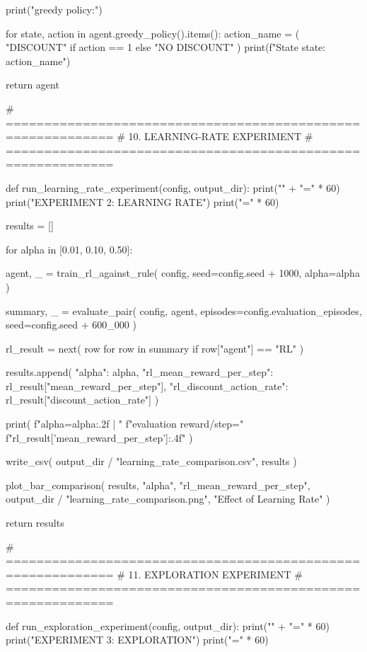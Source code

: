     print("\nLearned greedy policy:")

    for state, action in agent.greedy_policy().items():
        action_name = (
            "DISCOUNT" if action == 1
            else "NO DISCOUNT"
        )
        print(f"State {state}: {action_name}")

    return agent


# ============================================================
# 10. LEARNING-RATE EXPERIMENT
# ============================================================

def run_learning_rate_experiment(config, output_dir):
    print("\n" + "=" * 60)
    print("EXPERIMENT 2: LEARNING RATE")
    print("=" * 60)

    results = []

    for alpha in [0.01, 0.10, 0.50]:

        agent, _ = train_rl_against_rule(
            config,
            seed=config.seed + 1000,
            alpha=alpha
        )

        summary, _ = evaluate_pair(
            config,
            agent,
            episodes=config.evaluation_episodes,
            seed=config.seed + 600_000
        )

        rl_result = next(
            row for row in summary
            if row["agent"] == "RL"
        )

        results.append({
            "alpha": alpha,
            "rl_mean_reward_per_step":
                rl_result["mean_reward_per_step"],
            "rl_discount_action_rate":
                rl_result["discount_action_rate"]
        })

        print(
            f"alpha={alpha:.2f} | "
            f"evaluation reward/step="
            f"{rl_result['mean_reward_per_step']:.4f}"
        )

    write_csv(
        output_dir / "learning_rate_comparison.csv",
        results
    )

    plot_bar_comparison(
        results,
        "alpha",
        "rl_mean_reward_per_step",
        output_dir / "learning_rate_comparison.png",
        "Effect of Learning Rate"
    )

    return results


# ============================================================
# 11. EXPLORATION EXPERIMENT
# ============================================================

def run_exploration_experiment(config, output_dir):
    print("\n" + "=" * 60)
    print("EXPERIMENT 3: EXPLORATION")
    print("=" * 60)

